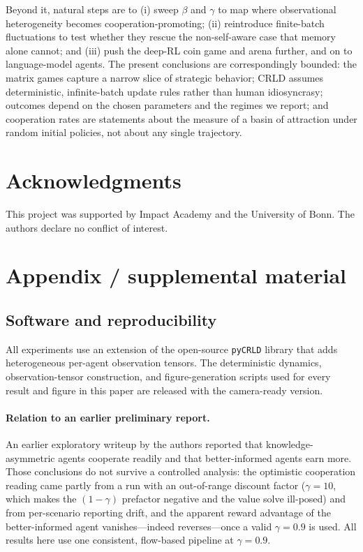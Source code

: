\documentclass{article}
\begin{document}
Beyond it, natural steps are to (i) sweep $\beta$ and $\gamma$ to map where observational heterogeneity becomes cooperation-promoting; (ii) reintroduce finite-batch fluctuations \cite{8} to test whether they rescue the non-self-aware case that memory alone cannot; and (iii) push the deep-RL coin game and arena \cite{17} further, and on to language-model agents. The present conclusions are correspondingly bounded: the matrix games capture a narrow slice of strategic behavior; CRLD assumes deterministic, infinite-batch update rules rather than human idiosyncrasy; outcomes depend on the chosen parameters and the regimes we report; and cooperation rates are statements about the measure of a basin of attraction under random initial policies, not about any single trajectory.

\section{Acknowledgments}

This project was supported by Impact Academy and the University of Bonn. The authors declare no conflict of interest.

\newpage
{
\small


}

\newpage
\appendix
\section{Appendix / supplemental material}

\subsection{Software and reproducibility}

All experiments use an extension of the open-source \texttt{pyCRLD} library \cite{10} that adds heterogeneous per-agent observation tensors. The deterministic dynamics, observation-tensor construction, and figure-generation scripts used for every result and figure in this paper are released with the camera-ready version.

\paragraph{Relation to an earlier preliminary report.}
An earlier exploratory writeup by the authors reported that knowledge-asymmetric agents cooperate readily and that better-informed agents earn more. Those conclusions do not survive a controlled analysis: the optimistic cooperation reading came partly from a run with an out-of-range discount factor ($\gamma=10$, which makes the $(1-\gamma)$ prefactor negative and the value solve ill-posed) and from per-scenario reporting drift, and the apparent reward advantage of the better-informed agent vanishes---indeed reverses---once a valid $\gamma=0.9$ is used. All results here use one consistent, flow-based pipeline at $\gamma=0.9$.
\end{document}

